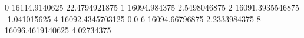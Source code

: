 0 16114.9140625 22.4794921875
1 16094.984375 2.5498046875
2 16091.3935546875 -1.041015625
4 16092.4345703125 0.0
6 16094.66796875 2.2333984375
8 16096.4619140625 4.02734375

